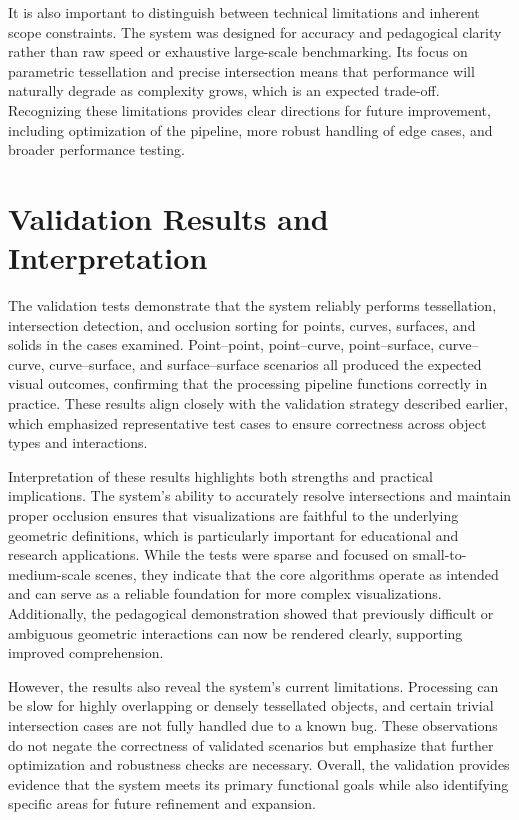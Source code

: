 It is also important to distinguish between technical limitations 
and inherent scope constraints. The system was designed for accuracy 
and pedagogical clarity rather than raw speed or exhaustive large-scale 
benchmarking. Its focus on parametric tessellation and precise 
intersection means that performance will naturally degrade as 
complexity grows, which is an expected trade-off. Recognizing these 
limitations provides clear directions for future improvement, 
including optimization of the pipeline, more robust handling of edge 
cases, and broader performance testing.

\section{Validation Results and Interpretation}

The validation tests demonstrate that the system reliably performs 
tessellation, intersection detection, and occlusion sorting for 
points, curves, surfaces, and solids in the cases examined. 
Point--point, point--curve, point--surface, curve--curve, 
curve--surface, and surface--surface scenarios all produced the 
expected visual outcomes, confirming that the processing pipeline 
functions correctly in practice. These results align closely with 
the validation strategy described earlier, which emphasized 
representative test cases to ensure correctness across object
types and interactions.

Interpretation of these results highlights both strengths and 
practical implications. The system's ability to accurately 
resolve intersections and maintain proper occlusion ensures that 
visualizations are faithful to the underlying geometric definitions, 
which is particularly important for educational and research 
applications. While the tests were sparse and focused on 
small-to-medium-scale scenes, they indicate that the core algorithms 
operate as intended and can serve as a reliable foundation for more 
complex visualizations. Additionally, the pedagogical demonstration 
showed that previously difficult or ambiguous geometric interactions 
can now be rendered clearly, supporting improved comprehension.

However, the results also reveal the system's current limitations.
 Processing can be slow for highly overlapping or densely tessellated 
 objects, and certain trivial intersection cases are not fully handled 
 due to a known bug. These observations do not negate the correctness 
 of validated scenarios but emphasize that further optimization and 
 robustness checks are necessary. Overall, the validation provides 
 evidence that the system meets its primary functional goals while 
 also identifying specific areas for future refinement and expansion.

